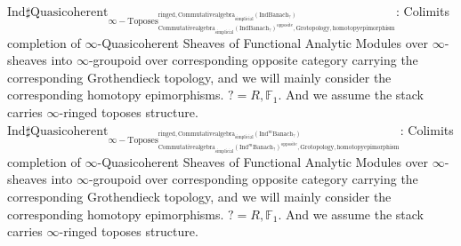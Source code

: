 \documentclass[11pt]{book}
\theoremstyle{definition}
\numberwithin{equation}{section}
\begin{document}
\noindent $\mathrm{Ind}\mathrm{\sharp Quasicoherent}_{\infty-\mathrm{Toposes}^{\mathrm{ringed},\mathrm{Commutativealgebra}_{\mathrm{simplicial}}(\mathrm{Ind}\mathrm{Banach}_?)}_{\mathrm{Commutativealgebra}_{\mathrm{simplicial}}(\mathrm{Ind}\mathrm{Banach}_?)^\mathrm{opposite},\mathrm{Grotopology,homotopyepimorphism}}}$: Colimits completion of $\infty$-Quasicoherent Sheaves of Functional Analytic Modules over $\infty$-sheaves into $\infty$-groupoid over corresponding opposite category carrying the corresponding Grothendieck topology, and we will mainly consider the corresponding homotopy epimorphisms. $?=R,\mathbb{F}_1$. And we assume the stack carries $\infty$-ringed toposes structure.\\
\noindent $\mathrm{Ind}\mathrm{\sharp Quasicoherent}_{\infty-\mathrm{Toposes}^{\mathrm{ringed},\mathrm{Commutativealgebra}_{\mathrm{simplicial}}(\mathrm{Ind}^m\mathrm{Banach}_?)}_{\mathrm{Commutativealgebra}_{\mathrm{simplicial}}(\mathrm{Ind}^m\mathrm{Banach}_?)^\mathrm{opposite},\mathrm{Grotopology,homotopyepimorphism}}}$: Colimits completion of $\infty$-Quasicoherent Sheaves of Functional Analytic Modules over $\infty$-sheaves into $\infty$-groupoid over corresponding opposite category carrying the corresponding Grothendieck topology, and we will mainly consider the corresponding homotopy epimorphisms. $?=R,\mathbb{F}_1$. And we assume the stack carries $\infty$-ringed toposes structure.\\ 
 
\end{document}

